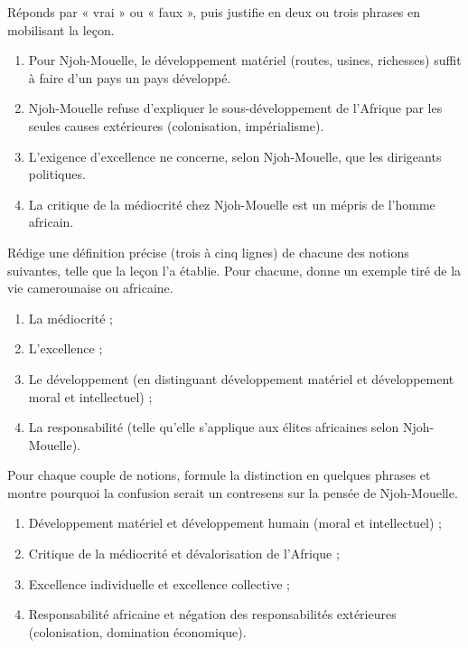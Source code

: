 \documentclass[11pt]{article}
\newcommand{\cle}[1]{{\popxbold\color{popdark}#1}}
\begin{document}
\begin{exercice}
Réponds par « vrai » ou « faux », puis justifie en deux ou trois phrases en mobilisant la leçon.

\begin{enumerate}
\item Pour Njoh-Mouelle, le développement matériel (routes, usines, richesses) suffit à faire d'un pays un pays développé.
\item Njoh-Mouelle refuse d'expliquer le sous-développement de l'Afrique par les seules causes extérieures (colonisation, impérialisme).
\item L'exigence d'excellence ne concerne, selon Njoh-Mouelle, que les dirigeants politiques.
\item La critique de la médiocrité chez Njoh-Mouelle est un mépris de l'homme africain.
\end{enumerate}
\end{exercice}

\begin{exercice}
Rédige une définition précise (trois à cinq lignes) de chacune des notions suivantes, telle que la leçon l'a établie. Pour chacune, donne un exemple tiré de la vie camerounaise ou africaine.

\begin{enumerate}
\item La \cle{médiocrité} ;
\item L'\cle{excellence} ;
\item Le \cle{développement} (en distinguant développement matériel et développement moral et intellectuel) ;
\item La \cle{responsabilité} (telle qu'elle s'applique aux élites africaines selon Njoh-Mouelle).
\end{enumerate}
\end{exercice}

\begin{exercice}
Pour chaque couple de notions, formule la distinction en quelques phrases et montre pourquoi la confusion serait un contresens sur la pensée de Njoh-Mouelle.

\begin{enumerate}
\item \cle{Développement matériel} et \cle{développement humain} (moral et intellectuel) ;
\item \cle{Critique de la médiocrité} et \cle{dévalorisation de l'Afrique} ;
\item \cle{Excellence individuelle} et \cle{excellence collective} ;
\item \cle{Responsabilité africaine} et \cle{négation des responsabilités extérieures} (colonisation, domination économique).
\end{enumerate}
\end{exercice}
\end{document}
